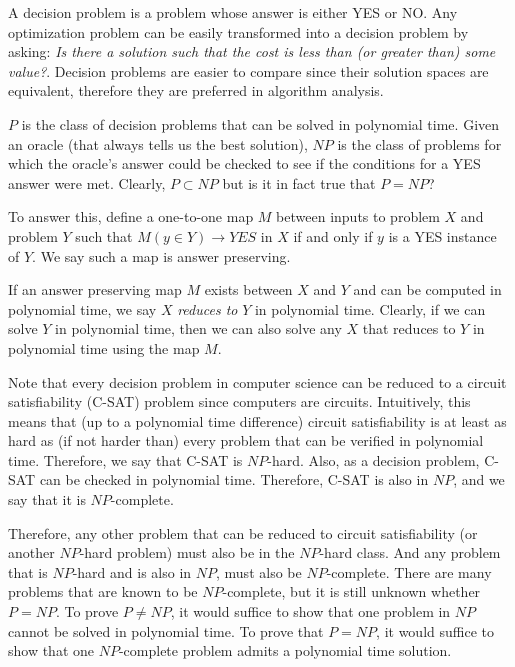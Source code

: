 \documentclass[12pt]{article}
\begin{document}
A decision problem is a problem whose answer is either YES or NO.
Any optimization problem can be easily transformed into a decision problem
by asking: {\it Is there a solution such that the cost is less than (or greater
than) some value?}.
Decision problems are easier to compare since their solution spaces are
equivalent, therefore they are preferred in algorithm analysis.

$P$ is the class of decision problems that can be solved in polynomial time.
Given an oracle (that always tells us the best solution), $NP$ is the class of
problems for which the oracle's answer could be checked to see if the
conditions for a YES answer were met.
Clearly, $P \subset NP$ but is it in fact true that $P=NP$?

To answer this, define a one-to-one map $M$ between inputs to problem $X$
and problem $Y$ such that $M(y \in Y) \rightarrow YES$ in $X$ 
if and only if $y$ is a YES instance of $Y$.
We say such a map is answer preserving. 

If an answer preserving map $M$ exists between $X$ and $Y$ and can be
computed in polynomial time, we say $X$ {\it reduces to} $Y$ in polynomial 
time.
Clearly, if we can solve $Y$ in polynomial time, then we can also solve any
$X$ that reduces to $Y$ in polynomial time using the map $M$. 

Note that every decision problem in computer science can be reduced to a 
circuit satisfiability (C-SAT) problem since computers are circuits.
Intuitively, this means that (up to a polynomial time difference) circuit 
satisfiability is at least as hard as (if not harder than) every problem
that can be verified in polynomial time.
Therefore, we say that C-SAT is $NP$-hard.
Also, as a decision problem, C-SAT can be checked in polynomial time.
Therefore, C-SAT is also in $NP$, and we say that it is
$NP$-complete.

Therefore, any other problem that can be reduced to circuit satisfiability 
(or another $NP$-hard problem) must also be in the $NP$-hard class.
And any problem that is $NP$-hard and is also in $NP$, must also be
$NP$-complete.
There are many problems that are known to be $NP$-complete, but it is still 
unknown whether $P=NP$.
To prove $P\neq NP$, it would suffice to show that one problem in $NP$
cannot be solved in polynomial time.
To prove that $P=NP$, it would suffice to show that one $NP$-complete
problem admits a polynomial time solution.
\end{document}
